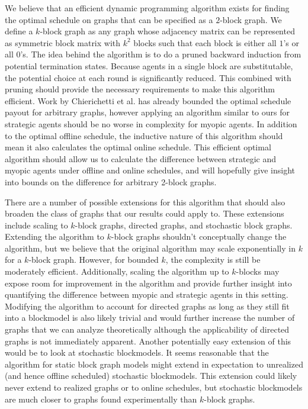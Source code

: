 \documentclass{article}
\begin{document}
We believe that an efficient dynamic programming algorithm exists for finding the optimal schedule on graphs that can be specified as a $2$-block graph. We define a $k$-block graph as any graph whose adjacency matrix can be represented as symmetric block matrix with $k^2$ blocks such that each block is either all $1$'s or all $0$'s. The idea behind the algorithm is to do a pruned backward induction from potential termination states. Because agents in a single block are substitutable, the potential choice at each round is significantly reduced. This combined with pruning should provide the necessary requirements to make this algorithm efficient. Work by Chierichetti et al.\cite{Chierichetti12} has already bounded the optimal schedule payout for arbitrary graphs, however applying an algorithm similar to ours for strategic agents should be no worse in complexity for myopic agents. In addition to the optimal offline schedule, the inductive nature of this algorithm should mean it also calculates the optimal online schedule. This efficient optimal algorithm should allow us to calculate the difference between strategic and myopic agents under offline and online schedules, and will hopefully give insight into bounds on the difference for arbitrary 2-block graphs.

There are a number of possible extensions for this algorithm that should also broaden the class of graphs that our results could apply to. These extensions include scaling to $k$-block graphs, directed graphs, and stochastic block graphs. Extending the algorithm to $k$-block graphs shouldn’t conceptually change the algorithm, but we believe that the original algorithm may scale exponentially in $k$ for a $k$-block graph. However, for bounded $k$, the complexity is still be moderately efficient. Additionally, scaling the algorithm up to $k$-blocks may expose room for improvement in the algorithm and provide further insight into quantifying the difference between myopic and strategic agents in this setting. Modifying the algorithm to account for directed graphs as long as they still fit into a blockmodel is also likely trivial and would further increase the number of graphs that we can analyze theoretically although the applicability of directed graphs is not immediately apparent. Another potentially easy extension of this would be to look at stochastic blockmodels\cite{Wang87, Snijders97}. It seems reasonable that the algorithm for static block graph models might extend in expectation to unrealized (and hence offline scheduled) stochastic blockmodels. This extension could likely never extend to realized graphs or to online schedules, but stochastic blockmodels are much closer to graphs found experimentally than $k$-block graphs.



\end{document}
